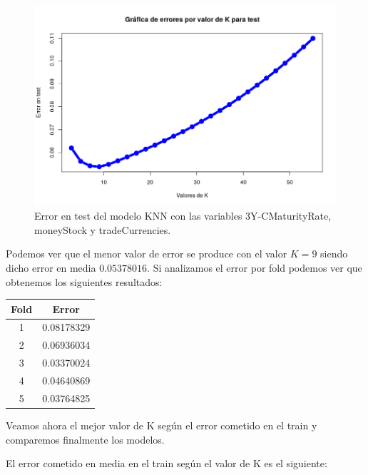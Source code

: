\documentclass[12pt,a4paper]{article}
\begin{document}
\begin{figure}[H]
	\centering 
	\includegraphics[scale=0.6]{./Imagenes/Regresion/knn5.png}
	\caption{Error en test del modelo KNN con las variables 3Y-CMaturityRate, moneyStock y tradeCurrencies.}
\end{figure}

Podemos ver que el menor valor de error se produce con el valor $K=9$ siendo dicho error en media $0.05378016$. Si analizamos el error por fold podemos ver que obtenemos los siguientes resultados:

\begin{table}[H]
	\centering
	\begin{tabular}{|c|c|}
		\hline
		\textbf{Fold} & \textbf{Error} \\ \hline
		1              & 0.08178329     \\ \hline
		2              & 0.06936034     \\ \hline
		3              & 0.03370024     \\ \hline
		4              & 0.04640869     \\ \hline
		5              & 0.03764825     \\ \hline
	\end{tabular}
\end{table}

Veamos ahora el mejor valor de K según el error cometido en el train y comparemos finalmente los modelos.

El error cometido en media en el train según el valor de K es el siguiente:
\end{document}
